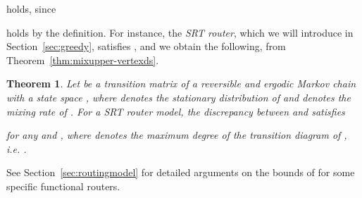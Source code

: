 \documentclass[letter, 11pt]{article}
\newcommand{\1}{\mbox{1}\hspace{-0.25em}\mbox{l}}
\newtheorem{theorem}{Theorem}[section]
\begin{document}
 holds, 
 since 

 holds by the definition. For instance, the {\em SRT router}, which we will introduce in Section~\ref{sec:greedy}, satisfies , and we obtain the following, from Theorem~\ref{thm:mixupper-vertexds}. 
\begin{theorem}
\label{thm:mixupper-vertexgreedy}
 Let  be a transition matrix of 
  a reversible and ergodic Markov chain with a state space , where  denotes the stationary distribution of  and  denotes the mixing rate of . 
For a SRT router model, the discrepancy between  and  satisfies

for any  and , where  denotes the maximum degree of the transition diagram of , {\rm i.e.} . 
\end{theorem}


See Section~\ref{sec:routingmodel} for detailed arguments on the bounds of  for some specific functional routers. 
\end{document}
